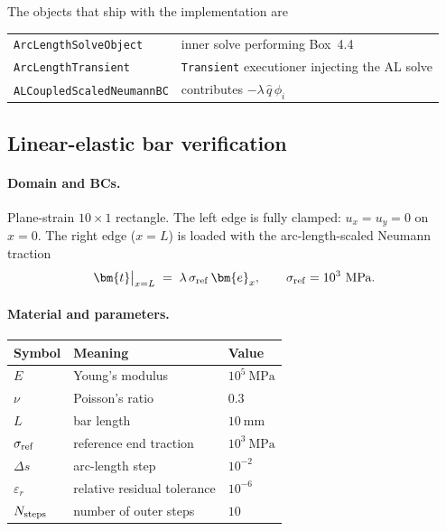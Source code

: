 The objects that ship with the implementation are
\begin{center}
\begin{tabular}{ll}
\toprule
\texttt{ArcLengthSolveObject} & inner solve performing Box~4.4 \\
\texttt{ArcLengthTransient} & \texttt{Transient} executioner injecting the AL solve \\
\texttt{ALCoupledScaledNeumannBC} & contributes $-\lambda\,\hat{q}\,\phi_i$ \\
\bottomrule
\end{tabular}
\end{center}

\subsection{Linear-elastic bar verification}
\label{subsec:arclength_box44_bar}

\paragraph{Domain and BCs.}
Plane-strain $10\times 1$ rectangle. The left edge is fully clamped:
$u_x = u_y = 0$ on $x=0$. The right edge ($x = L$) is loaded with the
arc-length-scaled Neumann traction
\begin{equation}
\bm{t}\big|_{x=L} \;=\; \lambda\,\sigma_{\rm ref}\,\bm{e}_x,
\qquad \sigma_{\rm ref} = 10^{3}~\text{MPa}.
\end{equation}

\paragraph{Material and parameters.}
\begin{table}[h]
\centering
\small
\begin{tabular}{lll}
\toprule
Symbol & Meaning & Value \\
\midrule
$E$ & Young's modulus & $10^{5}~\text{MPa}$ \\
$\nu$ & Poisson's ratio & $0.3$ \\
$L$ & bar length & $10~\text{mm}$ \\
$\sigma_{\rm ref}$ & reference end traction & $10^{3}~\text{MPa}$ \\
$\Delta s$ & arc-length step & $10^{-2}$ \\
$\varepsilon_r$ & relative residual tolerance & $10^{-6}$ \\
$N_{\rm steps}$ & number of outer steps & $10$ \\
\bottomrule
\end{tabular}
\end{table}

